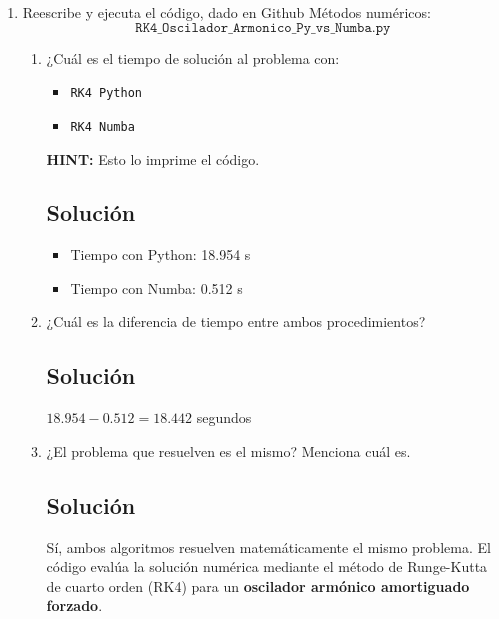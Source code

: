 \begin{enumerate}[label=\arabic*., leftmargin=*]
\begin{enumerate}[label=(\alph*), leftmargin=*]
\begin{itemize}[leftmargin=*]
            \item \textbf{\texttt{BDF}:} Método implícito multipaso de orden variable (1 a 5) basado en una fórmula de diferenciación hacia atrás. Utiliza un esquema de pasos casi constantes y está enfocado a problemas rígidos.

            \item \textbf{\texttt{LSODA}:} Método híbrido Adams/BDF. Funciona como un envoltorio del solucionador de Fortran ODEPACK y cuenta con detección automática de rigidez, cambiando de método según las necesidades del problema.
        \end{itemize}
    \end{enumerate}

    \item Reescribe y ejecuta el código, dado en Github Métodos numéricos: 
    \[\texttt{RK4\_Oscilador\_Armonico\_Py\_vs\_Numba.py}\]
    \begin{enumerate}[label=(\alph*), leftmargin=*]
        \item ¿Cuál es el tiempo de solución al problema con:
        \begin{itemize}[leftmargin=*]
            \item \texttt{RK4 Python}
            \item \texttt{RK4 Numba}
        \end{itemize}
        \textbf{HINT:} Esto lo imprime el código.
        \subsection*{Solución}
        \begin{itemize}
            \item Tiempo con Python: 18.954 s  
            \item Tiempo con Numba: 0.512 s   
        \end{itemize}

        \item ¿Cuál es la diferencia de tiempo entre ambos procedimientos?
        \subsection*{Solución}
        $18.954 - 0.512 = 18.442$ segundos

        \item ¿El problema que resuelven es el mismo? Menciona cuál es.
        \subsection*{Solución}
        Sí, ambos algoritmos resuelven matemáticamente el mismo problema. El código evalúa la solución numérica mediante el método de Runge-Kutta de cuarto orden (RK4) para un \textbf{oscilador armónico amortiguado forzado}.


\end{enumerate}
\end{enumerate}
